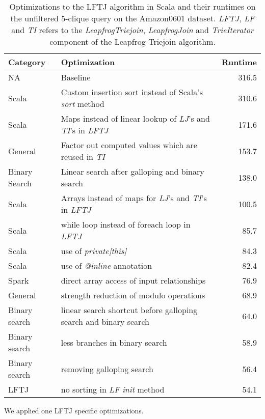 \begin{table}
    \begin{tabular}{llr}
        \toprule
        Category & Optimization & Runtime \\ \midrule
        NA & Baseline     & 316.5   \\
        Scala & Custom insertion sort instead of Scala's \textit{sort} method & 310.6 \\
        Scala & Maps instead of linear lookup of \textit{LJ}'s and \textit{TI}'s in \textit{LFTJ} & 171.6 \\
        General & Factor out computed values which are reused in \textit{TI} & 153.7 \\
        Binary Search & Linear search after galloping and binary search & 138.0 \\
        Scala & Arrays instead of maps for \textit{LJ}'s and \textit{TI}'s in \textit{LFTJ} & 100.5 \\
        Scala & while loop instead of foreach loop in \textit{LFTJ} & 85.7 \\
        Scala & use of \textit{private[this]}                     & 84.3 \\
        Scala & use of \textit{@inline} annotation                & 82.4 \\
        Spark & direct array access of input relationships       & 76.9 \\
        General & strength reduction of modulo operations           & 68.9 \\
        Binary search & linear search shortcut before galloping search and binary search & 64.0 \\
        Binary search & less branches in binary search & 58.9 \\
        Binary search & removing galloping search      & 56.4 \\
        LFTJ          & no sorting in \textit{LF} \textit{init} method &  54.1 \\
        \bottomrule
   \end{tabular}
    \caption{Optimizations to the \textsc{LFTJ} algorithm in Scala and their runtimes on the unfiltered 5-clique query on
       the Amazon0601 dataset.
       \textit{LFTJ}, \textit{LF} and \textit{TI} refers to the \textit{LeapfrogTriejoin}, \textit{LeapfrogJoin}
       and \textit{TrieIterator} component of the Leapfrog Triejoin algorithm.
    }
    \label{table:lftj-optimizations}
\end{table}
We applied one \textsc{LFTJ} specific optimizations.

